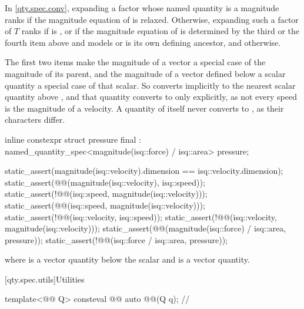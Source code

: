 \pnum
In \ref{qty.spec.conv}, expanding a factor whose named quantity is a magnitude 
ranks  if the magnitude equation of  is relaxed.
Otherwise, expanding such a factor of $T$ ranks 
if  is , or
if the magnitude equation of  is determined by the third or the fourth item above and
 models  or is its own defining ancestor,
and  otherwise.
\begin{note}
The first two items make the magnitude of a vector a special case of the magnitude of its parent,
and the magnitude of a vector defined below a scalar quantity a special case of that scalar.
So  converts implicitly to the nearest scalar quantity above ,
and that quantity converts to  only explicitly,
as not every speed is the magnitude of a velocity.
A quantity of  itself never converts to ,
as their characters differ.
\end{note}
\begin{example}
\begin{codeblock}
inline constexpr struct pressure final : named_quantity_spec<magnitude(isq::force) / isq::area> {} pressure;

static_assert(magnitude(isq::velocity).dimension == isq::velocity.dimension);
static_assert(@@(magnitude(isq::velocity), isq::speed));
static_assert(!@@(isq::speed, magnitude(isq::velocity)));
static_assert(@@(isq::speed, magnitude(isq::velocity)));
static_assert(!@@(isq::velocity, isq::speed));
static_assert(!@@(isq::velocity, magnitude(isq::velocity)));
static_assert(@@(magnitude(isq::force) / isq::area, pressure));
static_assert(!@@(isq::force / isq::area, pressure));
\end{codeblock}
where  is a vector quantity below the scalar 
and  is a vector quantity.
\end{example}

[qty.spec.utils]{Utilities}

\begin{itemdecl}
template<@@ Q>
consteval @@ auto @@(Q q);    // \expos
\end{itemdecl}


